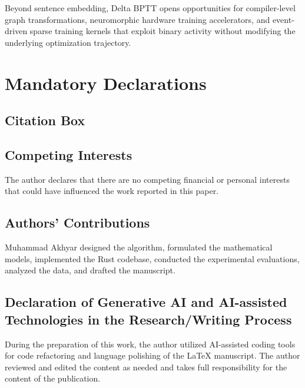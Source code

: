 \documentclass[10pt,journal,compsoc]{IEEEtran}
\begin{document}
Beyond sentence embedding, Delta BPTT opens opportunities for compiler-level graph transformations, neuromorphic hardware training accelerators, and event-driven sparse training kernels that exploit binary activity without modifying the underlying optimization trajectory.

\section*{Mandatory Declarations}

\subsection*{Citation Box}
\noindent{}

\subsection*{Competing Interests}
The author declares that there are no competing financial or personal interests that could have influenced the work reported in this paper.

\subsection*{Authors' Contributions}
Muhammad Akhyar designed the algorithm, formulated the mathematical models, implemented the Rust codebase, conducted the experimental evaluations, analyzed the data, and drafted the manuscript.

\subsection*{Declaration of Generative AI and AI-assisted Technologies in the Research/Writing Process}
During the preparation of this work, the author utilized AI-assisted coding tools for code refactoring and language polishing of the LaTeX manuscript. The author reviewed and edited the content as needed and takes full responsibility for the content of the publication.



\end{document}

